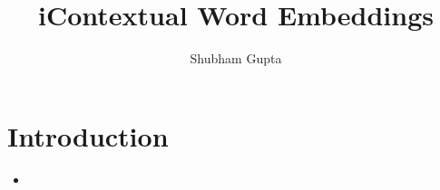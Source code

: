 \documentclass[a4paper]{article}
\title{iContextual Word Embeddings}
\author{Shubham Gupta}
\begin{document}
\maketitle
\section{Introduction}
\begin{itemize}
    \item 
\end{itemize}
\end{document}
